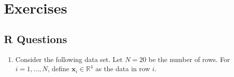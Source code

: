\documentclass[
  12pt,
]{krantz}
\providecommand{\tightlist}{%
  \setlength{\itemsep}{0pt}\setlength{\parskip}{0pt}}
\begin{document}
\hypertarget{exercises-2}{%
\section{Exercises}\label{exercises-2}}

\hypertarget{r-questions-2}{%
\subsection{R Questions}\label{r-questions-2}}

\begin{enumerate}
\def\labelenumi{\arabic{enumi}.}
\tightlist
\item
  Consider the following data set. Let \(N = 20\) be the number of rows. For \(i=1,\ldots,N\), define \(\mathbf{x}_i \in \mathbb{R}^4\) as the data in row \(i\).
\end{enumerate}
\end{document}
